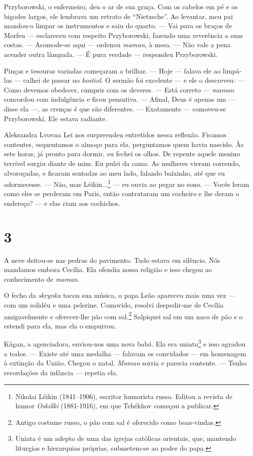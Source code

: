 Przyborowski, o enfermeiro, deu o ar de sua graça. Com os cabelos em pé
e os bigodes largos, ele lembrava um retrato de ``Nietzsche''. Ao
levantar, meu pai mandou-o limpar os instrumentos e saiu do quarto. ---
Vai para os braços de Morfeu --- esclareceu com respeito Przyborowski,
fazendo uma reverência a suas costas. --- Acomode-se aqui --- ordenou
\emph{maman}, à mesa. --- Não vale a pena acender outra lâmpada. --- É
pura verdade --- respondeu Przyborowski.

Pinças e tesouras variadas começaram a brilhar. --- Hoje --- falava ele
ao limpá-las --- calhei de passar no \emph{kostiol}. O sermão foi
excelente --- e ele o descreveu: --- Como devemos obedecer, cumprir com
os deveres. --- Está correto --- \emph{maman} concordou com indulgência
e ficou pensativa. --- Afinal, Deus é apenas um --- disse ela ---, as
crenças é que são diferentes. --- Exatamente --- comoveu-se
Przyborowski. Ele estava radiante.

Aleksandra Lvovna Lei nos surpreendeu entretidos nessa reflexão. Ficamos
contentes, esquentamos o almoço para ela, perguntamos quem havia
nascido. Às sete horas, já pronto para dormir, eu fechei os olhos. De
repente aquele menino terrível surgiu diante de mim. Eu pulei da cama.
As mulheres vieram correndo, alvoroçadas, e ficaram sentadas ao meu
lado, falando baixinho, até que eu adormecesse. --- Não, mas
Léikin...\footnote{Nikolai Léikin (1841--1906), escritor humorista
  russo. Editou a revista de humor \emph{Oskólki} (1881-1916), em
  que Tchékhov começou a publicar.} --- eu ouvia ao pegar no sono. ---
Vocês leram como eles se perderam em Paris, então contrataram um
cocheiro e lhe deram o endereço? --- e elas riam aos cochichos.

\section{3}

A neve deitou-se nas pedras do pavimento. Tudo estava em silêncio. Nós
mandamos embora Cecília. Ela ofendia nossa religião e isso chegou ao
conhecimento de \emph{maman}.

O fecho da \emph{skrynka} tocou sua música, o papa Leão apareceu mais
uma vez --- com um solidéu e uma pelerine. Comovido, resolvi despedir-me
de Cecília amigavelmente e oferecer-lhe pão com sal.\footnote{Antigo
  costume russo, o pão com sal é oferecido como boas-vindas.} Salpiquei
sal em um naco de pão e o estendi para ela, mas ela o empurrou.

Kágan, a agenciadora, enviou-nos uma nova babá. Ela era uniata\footnote{Uniata
  é um adepto de uma das igrejas católicas orientais, que, mantendo
  liturgias e hierarquias próprias, submetem-se ao poder do papa.} e
isso agradou a todos. --- Existe até uma medalha --- falavam os
convidados --- em homenagem à extinção da União. Chegou o natal.
\emph{Maman} sorria e parecia contente. --- Tenho recordações da
infância --- repetia ela.

